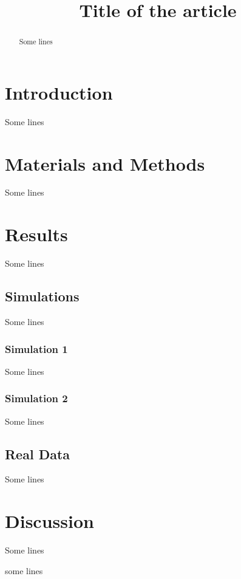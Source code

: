\documentclass[draft,jgrga]{/home/gdj/文档/template/agu_template/AGUTeX}
\begin{document}
\title{Title of the article}

\begin{abstract}
    Some lines
\end{abstract}

\begin{article}
\section{Introduction}
    Some lines
\section{Materials and Methods}
    Some lines
\section{Results}
    Some lines
\subsection{Simulations}
    Some lines
\subsubsection{Simulation 1}
    Some lines
\subsubsection{Simulation 2}
    Some lines
\subsection{Real Data}
    Some lines
\section{Discussion}
    Some lines
\begin{acknowledgments}

    some lines
\end{acknowledgments}


\end{article}
%
%
\end{document}
